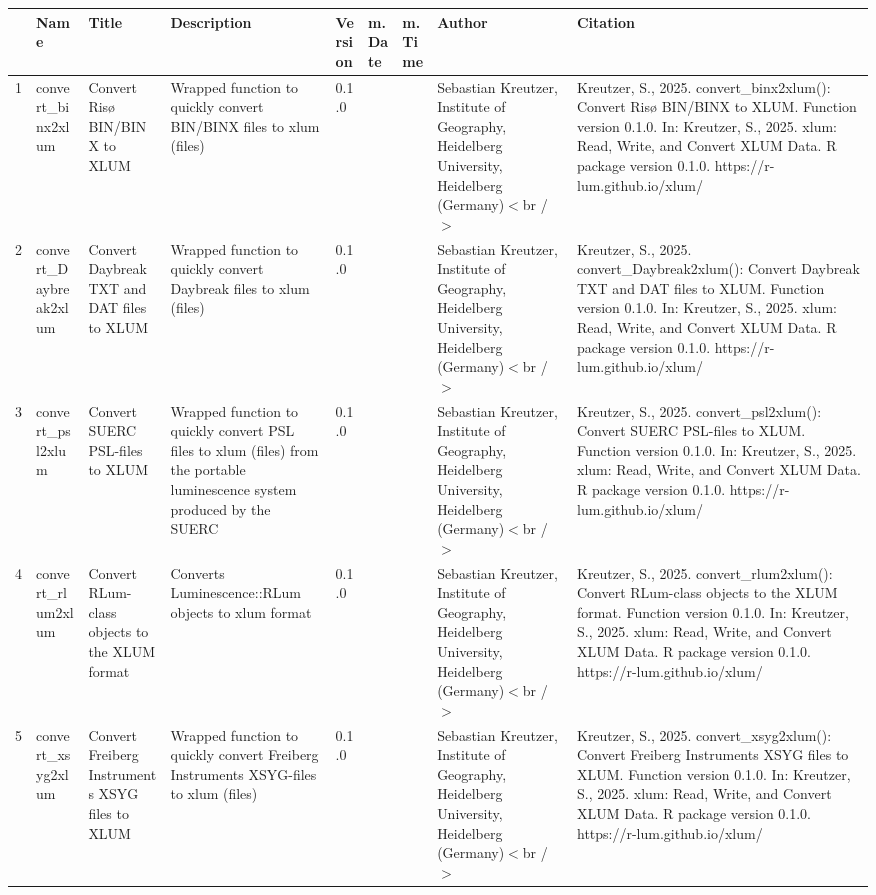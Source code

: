 \begin{table}[ht]
\centering
\begin{tabular}{rllllllll}
  \hline
 & Name & Title & Description & Version & m.Date & m.Time & Author & Citation \\ 
  \hline
1 & convert\_binx2xlum & Convert Risø BIN/BINX to XLUM & Wrapped function to quickly convert BIN/BINX files to  xlum  (files) & 0.1.0
 &  &  & Sebastian Kreutzer, Institute of Geography, Heidelberg University, Heidelberg (Germany)$<$br /$>$ & Kreutzer, S., 2025. convert\_binx2xlum(): Convert Risø BIN/BINX to XLUM. Function version 0.1.0. In: Kreutzer, S., 2025. xlum: Read, Write, and Convert XLUM Data. R package version 0.1.0. https://r-lum.github.io/xlum/
 \\ 
  2 & convert\_Daybreak2xlum & Convert Daybreak TXT and DAT files to XLUM & Wrapped function to quickly convert Daybreak files to  xlum  (files) & 0.1.0
 &  &  & Sebastian Kreutzer, Institute of Geography, Heidelberg University, Heidelberg (Germany)$<$br /$>$ & Kreutzer, S., 2025. convert\_Daybreak2xlum(): Convert Daybreak TXT and DAT files to XLUM. Function version 0.1.0. In: Kreutzer, S., 2025. xlum: Read, Write, and Convert XLUM Data. R package version 0.1.0. https://r-lum.github.io/xlum/
 \\ 
  3 & convert\_psl2xlum & Convert SUERC PSL-files to XLUM & Wrapped function to quickly convert PSL files to  xlum  (files) from the portable luminescence system produced by the SUERC & 0.1.0
 &  &  & Sebastian Kreutzer, Institute of Geography, Heidelberg University, Heidelberg (Germany)$<$br /$>$ & Kreutzer, S., 2025. convert\_psl2xlum(): Convert SUERC PSL-files to XLUM. Function version 0.1.0. In: Kreutzer, S., 2025. xlum: Read, Write, and Convert XLUM Data. R package version 0.1.0. https://r-lum.github.io/xlum/
 \\ 
  4 & convert\_rlum2xlum & Convert RLum-class objects to the XLUM format & Converts  Luminescence::RLum  objects to xlum format & 0.1.0
 &  &  & Sebastian Kreutzer, Institute of Geography, Heidelberg University, Heidelberg (Germany)$<$br /$>$ & Kreutzer, S., 2025. convert\_rlum2xlum(): Convert RLum-class objects to the XLUM format. Function version 0.1.0. In: Kreutzer, S., 2025. xlum: Read, Write, and Convert XLUM Data. R package version 0.1.0. https://r-lum.github.io/xlum/
 \\ 
  5 & convert\_xsyg2xlum & Convert Freiberg Instruments XSYG files to XLUM & Wrapped function to quickly convert Freiberg Instruments XSYG-files to  xlum  (files) & 0.1.0
 &  &  & Sebastian Kreutzer, Institute of Geography, Heidelberg University, Heidelberg (Germany)$<$br /$>$ & Kreutzer, S., 2025. convert\_xsyg2xlum(): Convert Freiberg Instruments XSYG files to XLUM. Function version 0.1.0. In: Kreutzer, S., 2025. xlum: Read, Write, and Convert XLUM Data. R package version 0.1.0. https://r-lum.github.io/xlum/

\end{tabular}
\end{table}
